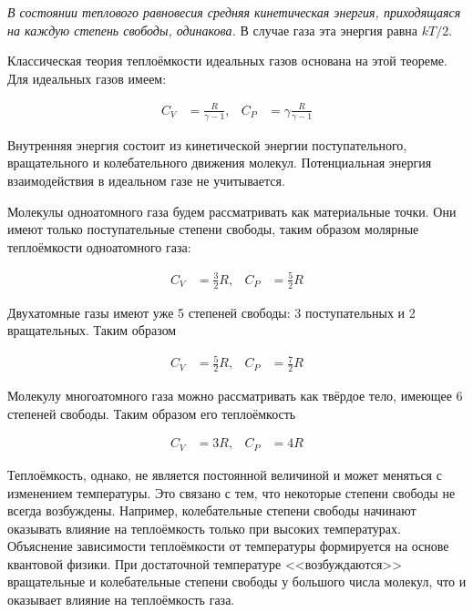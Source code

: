 \textit{В состоянии теплового равновесия средняя кинетическая энергия, приходящаяся на каждую степень свободы, одинакова.} В случае газа эта энергия равна $k T / 2$.

Классическая теория теплоёмкости идеальных газов основана на этой теореме. Для идеальных газов имеем:

\begin{align}
    C_V &= \frac{R}{\gamma - 1}, & C_P &= \gamma \frac{R}{\gamma - 1}
\end{align}

Внутренняя энергия состоит из кинетической энергии поступательного, вращательного и колебательного движения молекул. Потенциальная энергия взаимодействия в идеальном газе не учитывается.

Молекулы одноатомного газа будем рассматривать как материальные точки. Они имеют только поступательные степени свободы, таким образом молярные теплоёмкости одноатомного газа:

\begin{align}
    C_V &= \frac{3}{2} R, & C_P &= \frac{5}{2} R
\end{align}

Двухатомные газы имеют уже 5 степеней свободы: 3 поступательных и 2 вращательных. Таким образом

\begin{align}
    C_V &= \frac{5}{2} R, & C_P &= \frac{7}{2} R
\end{align}

Молекулу многоатомного газа можно рассматривать как твёрдое тело, имеющее 6 степеней свободы. Таким образом его теплоёмкость

\begin{align}
    C_V &= 3 R, & C_P &= 4 R
\end{align}

Теплоёмкость, однако, не является постоянной величиной и может меняться с изменением температуры. Это связано с тем, что некоторые степени свободы не всегда возбуждены. Например, колебательные степени свободы начинают оказывать влияние на теплоёмкость только при высоких температурах. Объяснение зависимости теплоёмкости от температуры формируется на основе квантовой физики. При достаточной температуре <<возбуждаются>> вращательные и колебательные степени свободы у большого числа молекул, что и оказывает влияние на теплоёмкость газа.
